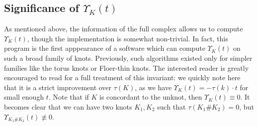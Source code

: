 \documentclass[reqno, 12pt]{amsart}
\theoremstyle{remark}
\begin{document}
\subsection{Significance of  $\Upsilon_K(t)$}
As mentioned above, the information of the full complex allows us to compute $\Upsilon_K(t)$, though the implementation is somewhat non-trivial. In fact, this program is the first apppearance of a software which can compute $\Upsilon_K(t)$ on such a broad family of knots. Previously, such algorithms existed only for simpler families like the torus knots or Floer-thin knots. The interested reader is greatly encouraged to read \cite{Ozsv_th_2017} for a full treatment of this invariant: we quickly note here that it is a strict improvement over $\tau(K)$, as we have $\Upsilon_K(t) = -\tau(k) \cdot t$ for small enough $t$. Note that if $K$ is concordant to the unknot, then $\Upsilon_K(t) \equiv 0$. It becomes clear that we can have two knots $K_1, K_2$ such that $\tau(K_1 \# K_2) = 0$, but  $\Upsilon_{K_1 \# K_2}(t) \not\equiv 0$. 
\end{document}
